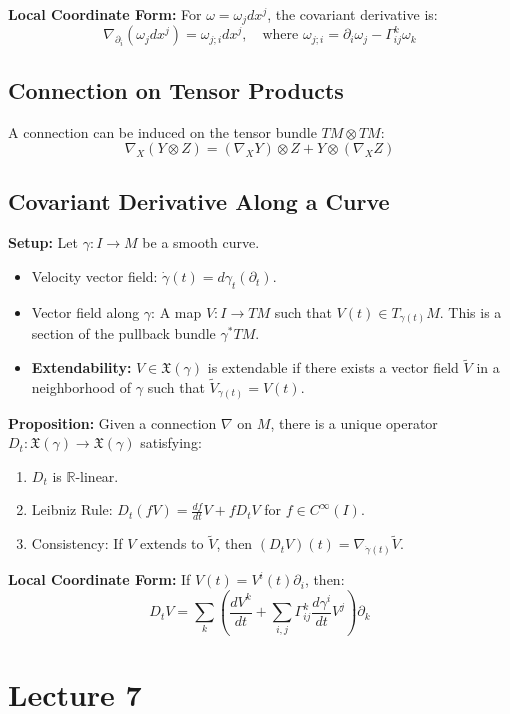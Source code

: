 \documentclass[11pt, a4paper]{article}
\theoremstyle{plain}
\theoremstyle{definition}
\theoremstyle{remark}
\begin{document}
\textbf{Local Coordinate Form:} For $\omega = \omega_j dx^j$, the covariant derivative is:
\[ \nabla_{\partial_i} (\omega_j dx^j) = \omega_{j;i} dx^j, \quad \text{where } \omega_{j;i} = \partial_i \omega_j - \Gamma_{ij}^k \omega_k \]

\subsection*{Connection on Tensor Products}
A connection can be induced on the tensor bundle $TM \otimes TM$:
\[ \nabla_X (Y \otimes Z) = (\nabla_X Y) \otimes Z + Y \otimes (\nabla_X Z) \]

\subsection*{Covariant Derivative Along a Curve}

\textbf{Setup:} Let $\gamma: I \to M$ be a smooth curve.
\begin{itemize}
    \item Velocity vector field: $\dot{\gamma}(t) = d\gamma_t(\partial_t)$.
    \item Vector field along $\gamma$: A map $V: I \to TM$ such that $V(t) \in T_{\gamma(t)}M$. This is a section of the pullback bundle $\gamma^* TM$.
    \item \textbf{Extendability:} $V \in \mathfrak{X}(\gamma)$ is extendable if there exists a vector field $\tilde{V}$ in a neighborhood of $\gamma$ such that $\tilde{V}_{\gamma(t)} = V(t)$.
\end{itemize}

\textbf{Proposition:} Given a connection $\nabla$ on $M$, there is a unique operator $D_t: \mathfrak{X}(\gamma) \to \mathfrak{X}(\gamma)$ satisfying:
\begin{enumerate}
    \item $D_t$ is $\mathbb{R}$-linear.
    \item Leibniz Rule: $D_t(fV) = \frac{df}{dt} V + f D_t V$ for $f \in C^\infty(I)$.
    \item Consistency: If $V$ extends to $\tilde{V}$, then $(D_t V)(t) = \nabla_{\dot{\gamma}(t)} \tilde{V}$.
\end{enumerate}

\textbf{Local Coordinate Form:} If $V(t) = V^i(t) \partial_i$, then:
\[ D_t V = \sum_k \left( \frac{dV^k}{dt} + \sum_{i,j} \Gamma_{ij}^k \frac{d\gamma^i}{dt} V^j \right) \partial_k \]
\newpage
\section{Lecture 7}
\end{document}

